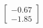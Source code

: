 \documentclass[preview]{standalone}
\begin{document}
\begin{align*}
\begin{bmatrix} -0.67 \\ -1.85 \end{bmatrix}
\end{align*}
\end{document}
